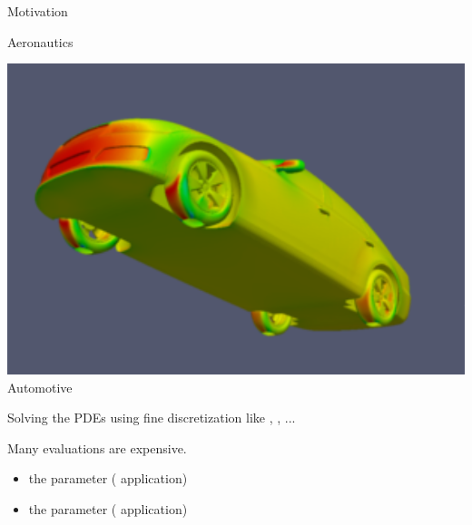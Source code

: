 \begin{frame}{Motivation}
\begin{minipage}{\textwidth}
\begin{minipage}{0.25\textwidth}
			Aeronautics
		\end{minipage}\hspace{0.5cm}
		\begin{minipage}{0.25\textwidth}\hspace{1cm}
			\includegraphics[width=\textwidth]{img/automotive.png}
			\centering
			Automotive 
		\end{minipage}
		\vspace{0.5cm}
	\end{minipage}

	Solving the PDEs using fine discretization like , , ...

	\vspace{0.5cm}
	 Many evaluations are expensive.
	\begin{itemize}
		\item {} the parameter ( application)
		\item {} the parameter ( application)
	\end{itemize}


	
\end{frame}















